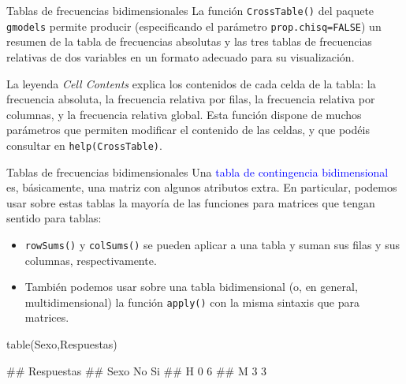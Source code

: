 \documentclass[
  ignorenonframetext,
  aspectratio=169]{beamer}
\newenvironment{Shaded}{\begin{snugshade}}{\end{snugshade}}
\newcommand{\FunctionTok}[1]{\textcolor[rgb]{0.00,0.00,0.00}{#1}}
\newcommand{\NormalTok}[1]{#1}
\let\oldverbatim\verbatim
\let\endoldverbatim\endverbatim
\renewenvironment{verbatim}{\tiny\oldverbatim}{\endoldverbatim}
\newcommand\blue[1]{\textcolor{blue}{#1}}
\begin{document}
\begin{frame}[fragile]{Tablas de frecuencias bidimensionales}
\protect\hypertarget{tablas-de-frecuencias-bidimensionales-7}{}
La función \texttt{CrossTable()} del paquete \texttt{gmodels} permite
producir (especificando el parámetro \texttt{prop.chisq=FALSE}) un
resumen de la tabla de frecuencias absolutas y las tres tablas de
frecuencias relativas de dos variables en un formato adecuado para su
visualización.

La leyenda \emph{Cell Contents} explica los contenidos de cada celda de
la tabla: la frecuencia absoluta, la frecuencia relativa por filas, la
frecuencia relativa por columnas, y la frecuencia relativa global. Esta
función dispone de muchos parámetros que permiten modificar el contenido
de las celdas, y que podéis consultar en \texttt{help(CrossTable)}.
\end{frame}

\begin{frame}[fragile]{Tablas de frecuencias bidimensionales}
\protect\hypertarget{tablas-de-frecuencias-bidimensionales-8}{}
Una \blue{tabla de contingencia bidimensional} es, básicamente, una
matriz con algunos atributos extra. En particular, podemos usar sobre
estas tablas la mayoría de las funciones para matrices que tengan
sentido para tablas:

\begin{itemize}
\item
  \texttt{rowSums()} y \texttt{colSums()} se pueden aplicar a una tabla
  y suman sus filas y sus columnas, respectivamente.
\item
  También podemos usar sobre una tabla bidimensional (o, en general,
  multidimensional) la función \texttt{apply()} con la misma sintaxis
  que para matrices.
\end{itemize}

\begin{Shaded}
\begin{Highlighting}[]
\FunctionTok{table}\NormalTok{(Sexo,Respuestas) }
\end{Highlighting}
\end{Shaded}

\begin{verbatim}
##     Respuestas
## Sexo No Si
##    H  0  6
##    M  3  3
\end{verbatim}
\end{frame}
\end{document}
